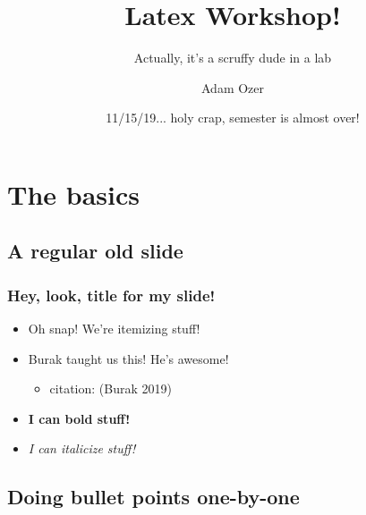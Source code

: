 \documentclass[12pt]{beamer}
\begin{document}
	\author{Adam Ozer}

	\title{Latex Workshop!}

	\subtitle{Actually, it's a scruffy dude in a lab}



	\date{11/15/19... holy crap, semester is almost over!}










	\frame[plain]{\maketitle}


\section{The basics} %


\subsection{A regular old slide} %


\begin{frame} %
\frametitle{Hey, look, title for my slide!} %
\begin{itemize} %
	\item Oh snap! We're itemizing stuff!
	\item Burak taught us this! He's awesome!
	\begin{itemize}
		\item citation: (Burak 2019)
	\end{itemize}
	\item \textbf{I can bold stuff!}
	\item \textit{I can italicize stuff!}
\end{itemize}
\end{frame} %


\subsection{Doing bullet points one-by-one} %
\end{document}
